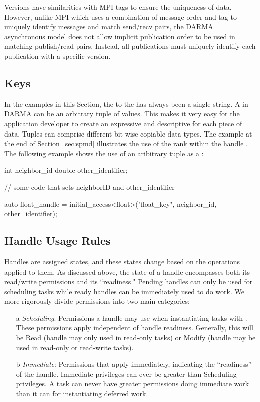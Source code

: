 Versions have similarities with MPI tags to ensure the uniqueness of data.
However, unlike MPI which uses a combination of message order and tag to uniquely identify messages and match send/recv pairs,
the DARMA asynchronous model does not allow implicit publication order to be used in matching publish/read pairs.
Instead, all publications must uniquely identify each publication with a specific version.


\subsection{Keys}
\label{subsec:keys}
In the examples in this Section, the  to the
 has always been a single string. 
A  in DARMA 
can be an arbitrary \gls{tuple} of values.  This 
makes it very easy for the application developer to create an expressive
and descriptive  for each piece of data.  Tuples can comprise
different bit-wise copiable data types.  The example at the end of
Section~\ref{sec:spmd} illustrates the use of the \gls{rank} within the handle
.  The following example shows the use of an
aribitrary \gls{tuple} as a :
\begin{CppCode}
  int neighbor_id
  double other_identifier;

  // some code that sets neighborID and other_identifier
  
  auto float_handle = initial_access<float>("float_key", 
                                            neighbor_id, 
                                            other_identifier);
\end{CppCode}

\subsection{Handle Usage Rules}
\label{sec:handlerules}
Handles are assigned states, and these states change 
based on the operations applied to them.  
As discussed above, the state of a handle encompasses both its read/write permissions and its ``readiness."
Pending handles can only be used for scheduling tasks while ready handles can be immediately used to do work.
We more rigorously divide permissions into two main categories: 
\begin{itemize}
\item[a] {\it Scheduling}: Permissions a handle may use when instantiating tasks with .
These permissions apply independent of handle readiness. 
Generally, this will be Read (handle may only used in read-only tasks) or Modify (handle may be used in read-only or read-write tasks). 
\item[b] {\it Immediate}: Permissions that apply immediately, indicating the ``readiness'' of the handle.  Immediate privileges can ever be greater than Scheduling privileges.
A task can never have greater permissions doing immediate work than it can for instantiating deferred work.
\end{itemize}

